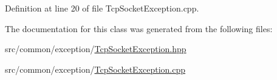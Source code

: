 Definition at line 20 of file Tcp\+Socket\+Exception.\+cpp.



The documentation for this class was generated from the following files\+:\begin{DoxyCompactItemize}
\item 
src/common/exception/\mbox{\hyperlink{_tcp_socket_exception_8hpp}{Tcp\+Socket\+Exception.\+hpp}}\item 
src/common/exception/\mbox{\hyperlink{_tcp_socket_exception_8cpp}{Tcp\+Socket\+Exception.\+cpp}}\end{DoxyCompactItemize}
